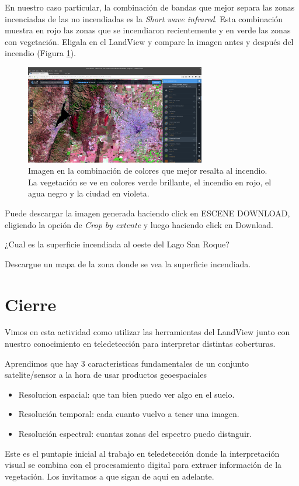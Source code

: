 \documentclass[a4paper,10pt]{article}
\begin{document}
En nuestro caso particular, la combinación de bandas que mejor separa las zonas incenciadas de las no incendiadas es la \emph{Short wave infrared}. Esta combinación muestra en rojo las zonas que se incendiaron recientemente y en verde las zonas con vegetación. Eligala en el LandView y compare la imagen antes y después del incendio (Figura \ref{fig:incendio}).

\begin{figure}[h!]
    \centering
    \includegraphics[width=0.7\textwidth]{fig:incendio.png}
    \caption{Imagen en la combinación de colores que mejor resalta al incendio. La vegetación se ve en colores verde brillante, el incendio en rojo, el agua negro y la ciudad en violeta.}
    \label{fig:incendio}
\end{figure}

Puede descargar la imagen generada haciendo click en ESCENE DOWNLOAD, eligiendo la opción de \emph{Crop by extente} y luego haciendo click en Download.

\begin{que}
    ¿Cual es la superficie incendiada al oeste del Lago San Roque?
\end{que}

\begin{que}
    Descargue un mapa de la zona donde se vea la superficie incendiada.
\end{que}

\section{Cierre}

Vimos en esta actividad como utilizar las herramientas del LandView junto con nuestro conocimiento en teledetección para interpretar distintas coberturas.

Aprendimos que hay 3 caracteristicas fundamentales de un conjunto satelite/sensor a la hora de usar productos geoespaciales

\begin{itemize}
    \item Resolucion espacial: que tan bien puedo ver algo en el suelo.
    \item Resolución temporal: cada cuanto vuelvo a tener una imagen.
    \item Resolución espectral: cuantas zonas del espectro puedo distnguir.
\end{itemize}

Este es el puntapie inicial al trabajo en teledetección donde la interpretación visual se combina con el procesamiento digital para extraer información de la vegetación. Los invitamos a que sigan de aquí en adelante.
\end{document}
